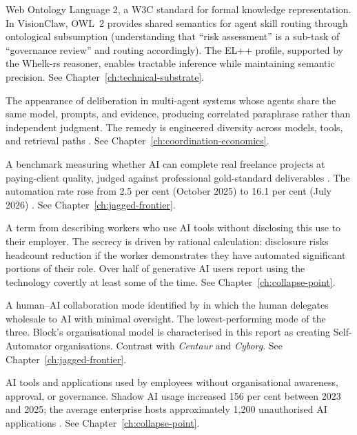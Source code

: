 \begin{description}[style=nextline, leftmargin=2em, font=\bfseries\color{navyblue}]
\item[OWL~2]
Web Ontology Language 2, a W3C standard for formal knowledge representation. In VisionClaw, OWL~2 provides shared semantics for agent skill routing through ontological subsumption (understanding that ``risk assessment'' is a sub-task of ``governance review'' and routing accordingly). The EL++ profile, supported by the Whelk-rs reasoner, enables tractable inference while maintaining semantic precision. See Chapter~\ref{ch:technical-substrate}.

\item[Pseudo-Diversity]
The appearance of deliberation in multi-agent systems whose agents share the same model, prompts, and evidence, producing correlated paraphrase rather than independent judgment. The remedy is engineered diversity across models, tools, and retrieval paths \parencite{Liu2026}. See Chapter~\ref{ch:coordination-economics}.

\item[Remote Labor Index (RLI)]
A benchmark measuring whether AI can complete real freelance projects at paying-client quality, judged against professional gold-standard deliverables \parencite{RLI2025}. The automation rate rose from 2.5 per cent (October 2025) to 16.1 per cent (July 2026) \parencite{CAIS2026RLI}. See Chapter~\ref{ch:jagged-frontier}.

\item[Secret Cyborg]
A term from \textcite{Mollick2023SecretCyborgs} describing workers who use AI tools without disclosing this use to their employer. The secrecy is driven by rational calculation: disclosure risks headcount reduction if the worker demonstrates they have automated significant portions of their role. Over half of generative AI users report using the technology covertly at least some of the time. See Chapter~\ref{ch:collapse-point}.

\item[Self-Automator]
A human--AI collaboration mode identified by \textcite{Randazzo2024} in which the human delegates wholesale to AI with minimal oversight. The lowest-performing mode of the three. Block's organisational model is characterised in this report as creating Self-Automator organisations. Contrast with \emph{Centaur} and \emph{Cyborg}. See Chapter~\ref{ch:jagged-frontier}.

\item[Shadow AI]
AI tools and applications used by employees without organisational awareness, approval, or governance. Shadow AI usage increased 156 per cent between 2023 and 2025; the average enterprise hosts approximately 1,200 unauthorised AI applications \parencite{Gartner2025}. See Chapter~\ref{ch:collapse-point}.


\end{description}
